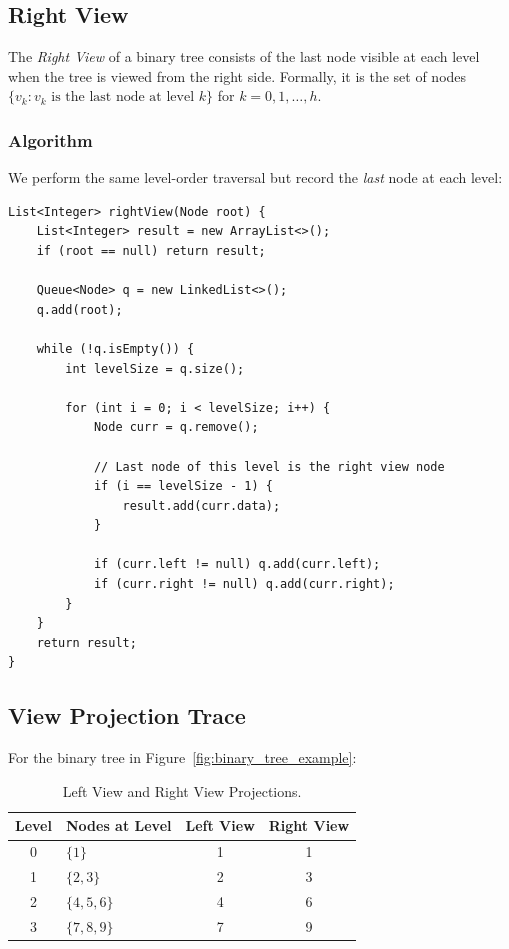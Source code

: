 \documentclass[10pt,journal,compsoc,onecolumn]{IEEEtran}
\begin{document}
\subsection{Right View}

The \emph{Right View} of a binary tree consists of the last node visible at each level when the tree is viewed from the right side. Formally, it is the set of nodes $\{v_k : v_k \text{ is the last node at level } k\}$ for $k = 0, 1, \ldots, h$.

\subsubsection{Algorithm}
We perform the same level-order traversal but record the \emph{last} node at each level:

\begin{verbatim}
List<Integer> rightView(Node root) {
    List<Integer> result = new ArrayList<>();
    if (root == null) return result;

    Queue<Node> q = new LinkedList<>();
    q.add(root);

    while (!q.isEmpty()) {
        int levelSize = q.size();

        for (int i = 0; i < levelSize; i++) {
            Node curr = q.remove();

            // Last node of this level is the right view node
            if (i == levelSize - 1) {
                result.add(curr.data);
            }

            if (curr.left != null) q.add(curr.left);
            if (curr.right != null) q.add(curr.right);
        }
    }
    return result;
}
\end{verbatim}

\subsection{View Projection Trace}
For the binary tree in Figure~\ref{fig:binary_tree_example}:

\begin{table}[htbp]
\centering
\caption{Left View and Right View Projections.}
\label{tab:view_projections}
\begin{tabular}{clcc}
\toprule
Level & Nodes at Level & Left View & Right View \\
\midrule
0 & $\{1\}$ & 1 & 1 \\
1 & $\{2, 3\}$ & 2 & 3 \\
2 & $\{4, 5, 6\}$ & 4 & 6 \\
3 & $\{7, 8, 9\}$ & 7 & 9 \\
\bottomrule
\end{tabular}
\end{table}
\end{document}
